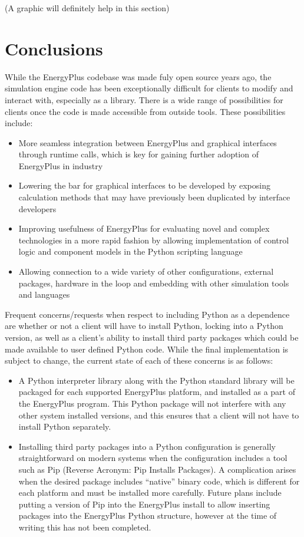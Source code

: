 \documentclass[5p]{elsarticle}
\begin{document}
(A graphic will definitely help in this section)

 \section*{Conclusions}
While the EnergyPlus codebase was made fuly open source years ago, the simulation engine code has been exceptionally difficult for clients to modify and interact with, especially as a library.  There is a wide range of possibilities for clients once the code is made accessible from outside tools.  These possibilities include:

\begin{itemize}
 \item More seamless integration between EnergyPlus and graphical interfaces through runtime calls, which is key for gaining further adoption of EnergyPlus in industry
 \item Lowering the bar for graphical interfaces to be developed by exposing calculation methods that may have previously been duplicated by interface developers
 \item Improving usefulness of EnergyPlus for evaluating novel and complex technologies in a more rapid fashion by allowing implementation of control logic and component models in the Python scripting language
 \item Allowing connection to a wide variety of other configurations, external packages, hardware in the loop and embedding with other simulation tools and languages
\end{itemize}

Frequent concerns/requests when respect to including Python as a dependence are whether or not a client will have to install Python, locking into a Python version, as well as a client’s ability to install third party packages which could be made available to user defined Python code.  While the final implementation is subject to change, the current state of each of these concerns is as follows:

\begin{itemize}
 \item A Python interpreter library along with the Python standard library will be packaged for each supported EnergyPlus platform, and installed as a part of the EnergyPlus program.  This Python package will not interfere with any other system installed versions, and this ensures that a client will not have to install Python separately.
 \item Installing third party packages into a Python configuration is generally straightforward on modern systems when the configuration includes a tool such as Pip (Reverse Acronym: Pip Installs Packages).  A complication arises when the desired package includes “native” binary code, which is different for each platform and must be installed more carefully.  Future plans include putting a version of Pip into the EnergyPlus install to allow inserting packages into the EnergyPlus Python structure, however at the time of writing this has not been completed.
\end{itemize}

 
  
\end{document}
